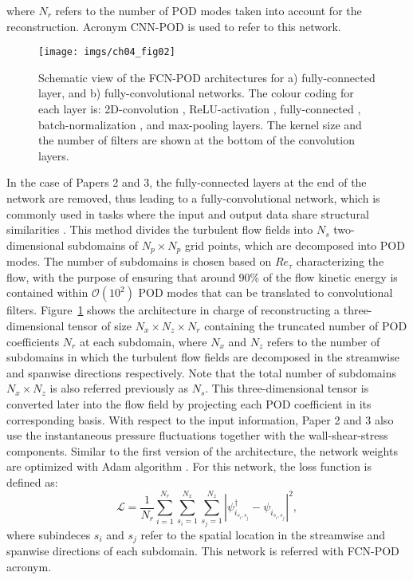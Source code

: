 \noindent where $N_r$ refers to the number of POD modes taken into account for the reconstruction.
Acronym CNN-POD is used to refer to this network.
\begin{figure}
  \centering
  \texttt{[image: imgs/ch04\_fig02]}
  \caption{\label{ch04:fig02}Schematic view of the FCN-POD architectures for a) fully-connected layer, and b) fully-convolutional networks. The colour coding for each layer is: 2D-convolution , ReLU-activation , fully-connected , batch-normalization , and max-pooling  layers. The kernel size and the number of filters are shown at the bottom of the convolution layers.}
\end{figure}

In the case of Papers 2 and 3, the fully-connected layers at the end of the network are removed, thus leading to a fully-convolutional network, which is commonly used in tasks where the input and output data share structural similarities \citep{long2015fully}.
This method divides the turbulent flow fields into $N_s$ two-dimensional subdomains of $N_p\times N_p$ grid points, which are decomposed into POD modes.
The number of subdomains is chosen based on $Re_{\tau}$ characterizing the flow, with the purpose of ensuring that around 90\% of the flow kinetic energy is contained within $\mathcal{O}(10^2)$ POD modes that can be translated to convolutional filters.
Figure~\ref{ch04:fig02} shows the architecture in charge of reconstructing a three-dimensional tensor of size $N_x\times N_z \times N_r$ containing the truncated number of POD coefficients $N_r$ at each subdomain, where $N_x$ and $N_z$ refers to the number of subdomains in which the turbulent flow fields are decomposed in the streamwise and spanwise directions respectively.
Note that the total number of subdomains $N_x \times N_z$ is also referred previously as $N_s$.
This three-dimensional tensor is converted later into the flow field by projecting each POD coefficient in its corresponding basis.
With respect to the input information, Paper 2 and 3 also use the instantaneous pressure fluctuations together with the wall-shear-stress components.
Similar to the first version of the architecture, the network weights are optimized with Adam algorithm \citep{kingma2014adam}.
For this network, the loss function is defined as:
\begin{equation}
    \mathcal{L}=\frac{1}{N_r}\sum^{N_r}_{i=1}\sum^{N_x}_{s_i=1}\sum^{N_z}_{s_j=1}|\psi^{\dagger}_{i_{s_i,s_j}} - \psi_{i_{s_i,s_j}}|^2,
\end{equation}
\noindent where subindeces $s_i$ and $s_j$ refer to the spatial location in the streamwise and spanwise directions of each subdomain.
This network is referred with FCN-POD acronym.

